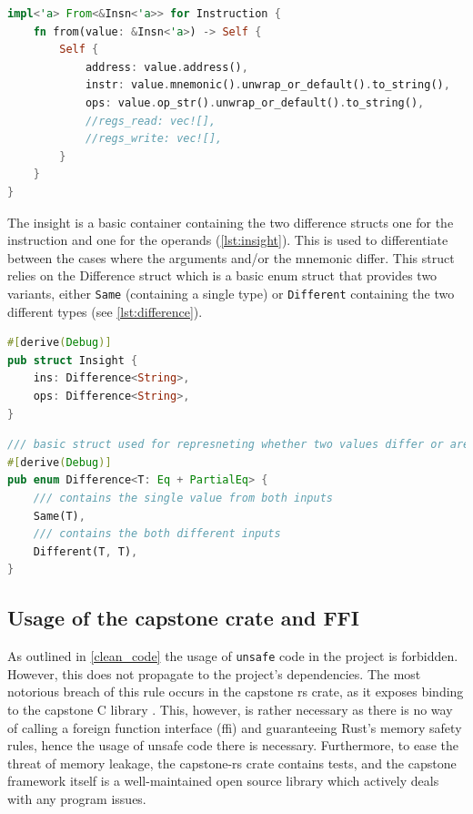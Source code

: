 \begin{lstlisting}[caption=\label{lst:ins-from-caps}{Function creating Instruction structs from capstone-specific Insn structs}, language=Rust]
impl<'a> From<&Insn<'a>> for Instruction {
    fn from(value: &Insn<'a>) -> Self {
        Self {
            address: value.address(),
            instr: value.mnemonic().unwrap_or_default().to_string(),
            ops: value.op_str().unwrap_or_default().to_string(),
            //regs_read: vec![],
            //regs_write: vec![],
        }
    }
}
\end{lstlisting}

The insight is a basic container containing the two difference structs one for the instruction and one for the operands (\autoref{lst:insight}).
This is used to differentiate between the cases where the arguments and/or the mnemonic differ.
This struct relies on the Difference struct which is a basic enum struct that provides two variants, either \verb|Same| (containing a single type) or \verb|Different| containing the two different types (see \autoref{lst:difference}).

\begin{lstlisting}[caption=\label{lst:insight}{The insight struct definition}, language=Rust]
#[derive(Debug)]
pub struct Insight {
    ins: Difference<String>,
    ops: Difference<String>,
}
\end{lstlisting}

\begin{lstlisting}[caption=\label{lst:difference}{The Difference generic struct definition}, language=Rust]
/// basic struct used for represneting whether two values differ or are the same
#[derive(Debug)]
pub enum Difference<T: Eq + PartialEq> {
    /// contains the single value from both inputs
    Same(T),
    /// contains the both different inputs
    Different(T, T),
}
\end{lstlisting}

\subsection{Usage of the capstone crate and FFI}

As outlined in \autoref{clean_code} the usage of \verb|unsafe| code in the project is forbidden. However, this does not propagate to the project's dependencies.
The most notorious breach of this rule occurs in the capstone rs crate, as it exposes binding to the capstone C library \cite{finkenauer_capstone-rustcapstone-rs_nodate}.
This, however, is rather necessary as there is no way of calling a foreign function interface (ffi) and guaranteeing Rust's memory safety rules, hence the usage of unsafe code there is necessary.
Furthermore, to ease the threat of memory leakage, the capstone-rs crate contains tests, and the capstone framework itself is a well-maintained open source library which actively deals with any program issues.

